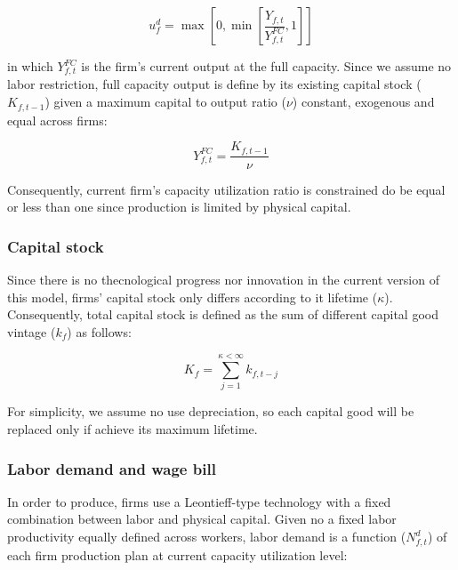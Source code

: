 \documentclass{SelfArx}
\begin{document}
\begin{latex}
\begin{equation}
u^{d}_{f} = \max\left[ 0, \min\left[ \frac{Y_{f,t}}{Y_{f,t}^{FC}}, 1 \right] \right]
\end{equation}
\end{latex}
in which \(Y_{f,t}^{FC}\) is the firm's current output at the full capacity.
Since we assume no labor restriction, full capacity output is define by its existing capital stock (\(K_{f,t-1}\)) given a maximum capital to output ratio (\(\nu\)) constant, exogenous and equal across firms:

\begin{latex}
\begin{equation}
Y_{f,t}^{FC} = \frac{K_{f,t-1}}{\nu}
\end{equation}
\end{latex}
Consequently, current firm's capacity utilization ratio is constrained do be equal or less than one since production is limited by physical capital.



\subsubsection{Capital stock}
\label{sec:orgad3f185}


Since there is no thecnological progress nor innovation in the current version of this model, firms' capital stock only differs according to it lifetime (\(\kappa\)).
Consequently, total capital stock is defined as the sum of different capital good vintage (\(k_{f}\)) as follows:

\begin{latex}
\begin{equation}
K_{f} = \sum_{j=1}^{\kappa < \infty} k_{f,t-j}
\end{equation}
\end{latex}
For simplicity, we assume no use depreciation, so each capital good will be replaced only if achieve its maximum lifetime.

\subsubsection{Labor demand and wage bill}
\label{sec:org92dab51}

In order to produce, firms use a Leontieff-type technology with a fixed combination between labor and physical capital.
Given no a fixed labor productivity equally defined across workers, labor demand is a function (\(N^{d}_{f,t}\)) of each firm production plan at current capacity utilization level:
\end{document}
